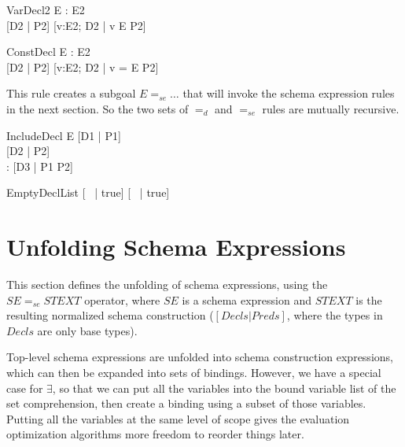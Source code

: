 \documentclass{article}
\newcommand{\sexprUnfoldsTo}{\mathrel{=_{se}}}
\newcommand{\declListUnfoldsTo}{\mathrel{=_d}}
\begin{document}
\begin{zedrule}{VarDecl2}
   \proviso E : \power E2 \\
   [D1 | true] \declListUnfoldsTo [D2 | P2]
\derives
   [v:E; D1 | true] \declListUnfoldsTo [v:E2; D2 |  v \in E \land P2]
\end{zedrule}

\begin{zedrule}{ConstDecl}
   \proviso E : E2 \\
   [D1 | true] \declListUnfoldsTo [D2 | P2]
\derives
   [v==E; D1 | true] \declListUnfoldsTo [v:E2; D2 |  v = E \land P2]
\end{zedrule}

This rule creates a subgoal $E \sexprUnfoldsTo \ldots$ that will
invoke the schema expression rules in the next section.  So the
two sets of $\declListUnfoldsTo$ and $\sexprUnfoldsTo$ rules are
mutually recursive.

\begin{zedrule}{IncludeDecl}
   E \sexprUnfoldsTo [D1 | P1] \\
   [D | true] \declListUnfoldsTo [D2 | P2] \\
   \proviso [D1 | true] \land [D2 | true] : \power [D3]
\derives
   [E; D | true] \declListUnfoldsTo [D3 |  P1 \land P2]
\end{zedrule}

\begin{zedrule}{EmptyDeclList}
   [~ | true] \declListUnfoldsTo [~ | true]
\end{zedrule}


\section{Unfolding Schema Expressions}

This section defines the unfolding of schema expressions,
using the $SE \sexprUnfoldsTo STEXT$ operator, where $SE$
is a schema expression and $STEXT$ is the resulting normalized
schema construction ($[Decls|Preds]$, where the types in $Decls$
are only base types).

Top-level schema expressions are unfolded into schema construction
expressions, which can then be expanded into sets of bindings.
However, we have a special case for $\exists$, so that we can
put all the variables into the bound variable list of the
set comprehension, then create a binding using a subset of
those variables.  Putting all the variables at the same level
of scope gives the evaluation optimization algorithms more
freedom to reorder things later.
\end{document}
